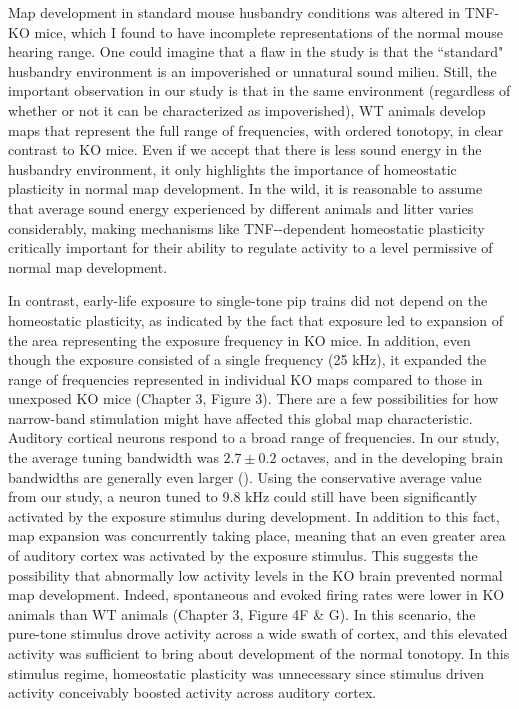 Map development in standard mouse husbandry conditions was altered in TNF-\textalpha{} KO mice, which I found to have incomplete representations of the normal mouse hearing range. One could imagine that a flaw in the study is that the ``standard" husbandry environment is an impoverished or unnatural sound milieu. Still, the important observation in our study is that in the same environment (regardless of whether or not it can be characterized as impoverished), WT animals develop maps that represent the full range of frequencies, with ordered tonotopy, in clear contrast to KO mice. Even if we accept that there is less sound energy in the husbandry environment, it only highlights the importance of homeostatic plasticity in normal map development. In the wild, it is reasonable to assume that average sound energy experienced by different animals and litter varies considerably, making mechanisms like TNF-\textalpha{}-dependent homeostatic plasticity critically important for their ability to regulate activity to a level permissive of normal map development.

In contrast, early-life exposure to single-tone pip trains did not depend on the homeostatic plasticity, as indicated by the fact that exposure led to expansion of the area representing the exposure frequency in KO mice. In addition, even though the exposure consisted of a single frequency (25 kHz), it expanded the range of frequencies represented in individual KO maps compared to those in unexposed KO mice (Chapter 3, Figure 3). There are a few possibilities for how narrow-band stimulation might have affected this global map characteristic. Auditory cortical neurons respond to a broad range of frequencies. In our study, the average tuning bandwidth was $2.7\pm0.2$ octaves, and in the developing brain bandwidths are generally even larger (\cite{Zhang2001}). Using the conservative average value from our study, a neuron tuned to 9.8 kHz could still have been significantly activated by the exposure stimulus during development. In addition to this fact, map expansion was concurrently taking place, meaning that an even greater area of auditory cortex was activated by the exposure stimulus. This suggests the possibility that abnormally low activity levels in the KO brain prevented normal map development. Indeed, spontaneous and evoked firing rates were lower in KO animals than WT animals (Chapter 3, Figure 4F \& G). In this scenario, the pure-tone stimulus drove activity across a wide swath of cortex, and this elevated activity was sufficient to bring about development of the normal tonotopy. In this stimulus regime, homeostatic plasticity was unnecessary since stimulus driven activity conceivably boosted activity across auditory cortex.

